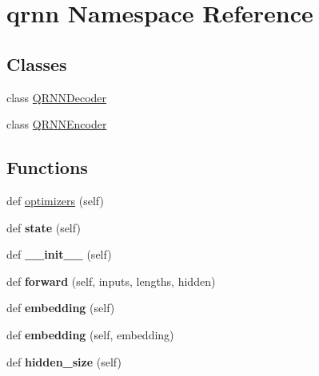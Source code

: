 \hypertarget{namespaceqrnn}{}\section{qrnn Namespace Reference}
\label{namespaceqrnn}
\subsection*{Classes}
\begin{DoxyCompactItemize}
\item 
class \hyperlink{classqrnn_1_1QRNNDecoder}{Q\+R\+N\+N\+Decoder}
\item 
class \hyperlink{classqrnn_1_1QRNNEncoder}{Q\+R\+N\+N\+Encoder}
\end{DoxyCompactItemize}
\subsection*{Functions}
\begin{DoxyCompactItemize}
\item 
def \hyperlink{namespaceqrnn_a4d4276bae224f1f3f564a743799207bb}{optimizers} (self)
\item 
def {\bfseries state} (self)\hypertarget{namespaceqrnn_a10babaca46481771e0d90473c1ccb8e7}{}\label{namespaceqrnn_a10babaca46481771e0d90473c1ccb8e7}

\item 
def {\bfseries \+\_\+\+\_\+init\+\_\+\+\_\+} (self)\hypertarget{namespaceqrnn_a80df11f79b2a3baa88a3ca46a7f1a799}{}\label{namespaceqrnn_a80df11f79b2a3baa88a3ca46a7f1a799}

\item 
def {\bfseries forward} (self, inputs, lengths, hidden)\hypertarget{namespaceqrnn_a0587de3b4093086229f39c14da2729fa}{}\label{namespaceqrnn_a0587de3b4093086229f39c14da2729fa}

\item 
def {\bfseries embedding} (self)\hypertarget{namespaceqrnn_a02b1d7d238561fd59d8c48b95867a3cd}{}\label{namespaceqrnn_a02b1d7d238561fd59d8c48b95867a3cd}

\item 
def {\bfseries embedding} (self, embedding)\hypertarget{namespaceqrnn_a97d05f9796063275fcd02426ad9529ab}{}\label{namespaceqrnn_a97d05f9796063275fcd02426ad9529ab}

\item 
def {\bfseries hidden\+\_\+size} (self)\hypertarget{namespaceqrnn_a19fce37d16d9993b9422d2683bc8456a}{}\label{namespaceqrnn_a19fce37d16d9993b9422d2683bc8456a}

\end{DoxyCompactItemize}


